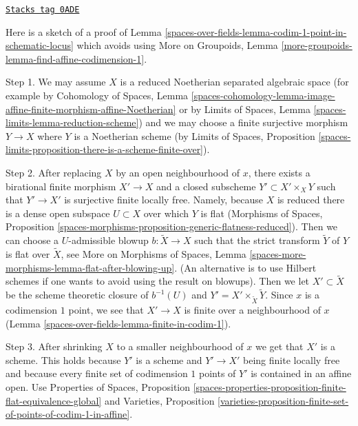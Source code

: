 \begin{remark}
\label{spaces-over-fields-remark-alternate-proof-scheme-codim-1}
\href{https://stacks.math.columbia.edu/tag/0ADE}{\texttt{Stacks tag 0ADE}}

Here is a sketch of a proof of
Lemma \ref{spaces-over-fields-lemma-codim-1-point-in-schematic-locus}
which avoids using
More on Groupoids, Lemma
\ref{more-groupoids-lemma-find-affine-codimension-1}.

\medskip\noindent
Step 1. We may assume $X$ is a reduced Noetherian separated algebraic space
(for example by Cohomology of Spaces, Lemma
\ref{spaces-cohomology-lemma-image-affine-finite-morphism-affine-Noetherian}
or by
Limits of Spaces, Lemma \ref{spaces-limits-lemma-reduction-scheme})
and we may choose a finite surjective morphism
$Y \to X$ where $Y$ is a Noetherian scheme (by
Limits of Spaces, Proposition
\ref{spaces-limits-proposition-there-is-a-scheme-finite-over}).

\medskip\noindent
Step 2. After replacing $X$ by an open neighbourhood of $x$, there
exists a birational finite morphism $X' \to X$ and a closed subscheme
$Y' \subset X' \times_X Y$ such that $Y' \to X'$ is surjective
finite locally free. Namely, because $X$ is reduced there is a dense
open subspace $U \subset X$ over which $Y$ is flat (Morphisms of Spaces,
Proposition \ref{spaces-morphisms-proposition-generic-flatness-reduced}).
Then we can choose a $U$-admissible blowup $b : \tilde X \to X$ such
that the strict transform $\tilde Y$ of $Y$ is flat over $\tilde X$, see
More on Morphisms of Spaces, Lemma
\ref{spaces-more-morphisms-lemma-flat-after-blowing-up}.
(An alternative is to use Hilbert schemes if one wants to avoid using
the result on blowups).
Then we let $X' \subset \tilde X$ be the scheme theoretic
closure of $b^{-1}(U)$ and $Y' = X' \times_{\tilde X} \tilde Y$.
Since $x$ is a codimension $1$ point, we see that $X' \to X$ is finite over a
neighbourhood of $x$ (Lemma \ref{spaces-over-fields-lemma-finite-in-codim-1}).

\medskip\noindent
Step 3. After shrinking $X$ to a smaller neighbourhood of $x$ we get that
$X'$ is a scheme. This holds because $Y'$ is a scheme and $Y' \to X'$
being finite locally free and because every finite set of codimension $1$
points of $Y'$ is contained in an affine open. Use
Properties of Spaces, Proposition
\ref{spaces-properties-proposition-finite-flat-equivalence-global}
and
Varieties, Proposition
\ref{varieties-proposition-finite-set-of-points-of-codim-1-in-affine}.


\end{remark}
